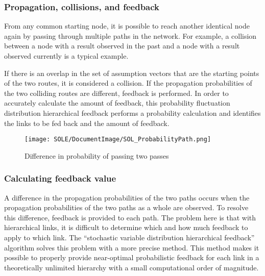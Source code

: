 \documentclass[12pt]{article}
\begin{document}
\subsubsection{Propagation, collisions, and
feedback}\label{propagation-collisions-and-feedback}

From any common starting node, it is possible to reach another identical
node again by passing through multiple paths in the network. For
example, a collision between a node with a result observed in the past
and a node with a result observed currently is a typical example.

If there is an overlap in the set of assumption vectors that are the
starting points of the two routes, it is considered a collision. If the
propagation probabilities of the two colliding routes are different,
feedback is performed. In order to accurately calculate the amount of
feedback, this probability fluctuation distribution hierarchical
feedback performs a probability calculation and identifies the links to
be fed back and the amount of feedback.

\begin{figure}[ht]
  \centering
  \texttt{[image: SOLE/DocumentImage/SOL\_ProbabilityPath.png]}
  \caption{Difference in probability of passing two passes}
  \label{fig:difference_in_probability_of_passing_two_passes}
\end{figure}

\subsubsection{Calculating feedback
value}\label{calculating-feedback-value}

A difference in the propagation probabilities of the two paths occurs
when the propagation probabilities of the two paths as a whole are
observed. To resolve this difference, feedback is provided to each path.
The problem here is that with hierarchical links, it is difficult to
determine which and how much feedback to apply to which link. The
``stochastic variable distribution hierarchical feedback'' algorithm
solves this problem with a more precise method. This method makes it
possible to properly provide near-optimal probabilistic feedback for
each link in a theoretically unlimited hierarchy with a small
computational order of magnitude.
\end{document}

